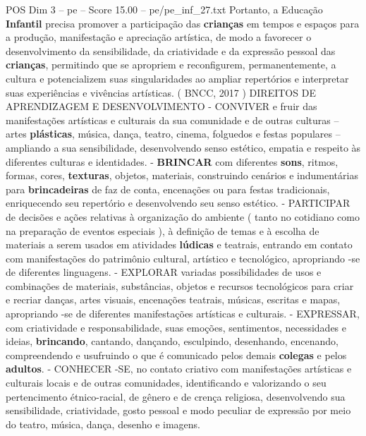 \begin{textsample}{POS Dim 3 – pe – Score 15.00 – pe/pe\_inf\_27.txt}
Portanto, a Educação \textbf{Infantil} precisa promover a participação das \textbf{crianças} em tempos e espaços para a produção, manifestação e apreciação artística, de modo a favorecer o desenvolvimento da sensibilidade, da criatividade e da expressão pessoal das \textbf{crianças}, permitindo que se apropriem e reconfigurem, permanentemente, a cultura e potencializem suas singularidades ao ampliar repertórios e interpretar suas experiências e vivências artísticas. ( BNCC, 2017 ) DIREITOS DE APRENDIZAGEM E DESENVOLVIMENTO - CONVIVER e fruir das manifestações artísticas e culturais da sua comunidade e de outras culturas – artes \textbf{plásticas}, música, dança, teatro, cinema, folguedos e festas populares – ampliando a sua sensibilidade, desenvolvendo senso estético, empatia e respeito às diferentes culturas e identidades. - \textbf{BRINCAR} com diferentes \textbf{sons}, ritmos, formas, cores, \textbf{texturas}, objetos, materiais, construindo cenários e indumentárias para \textbf{brincadeiras} de faz de conta, encenações ou para festas tradicionais, enriquecendo seu repertório e desenvolvendo seu senso estético. - PARTICIPAR de decisões e ações relativas à organização do ambiente ( tanto no cotidiano como na preparação de eventos especiais ), à definição de temas e à escolha de materiais a serem usados em atividades \textbf{lúdicas} e teatrais, entrando em contato com manifestações do patrimônio cultural, artístico e tecnológico, apropriando -se de diferentes linguagens. - EXPLORAR variadas possibilidades de usos e combinações de materiais, substâncias, objetos e recursos tecnológicos para criar e recriar danças, artes visuais, encenações teatrais, músicas, escritas e mapas, apropriando -se de diferentes manifestações artísticas e culturais. - EXPRESSAR, com criatividade e responsabilidade, suas emoções, sentimentos, necessidades e ideias, \textbf{brincando}, cantando, dançando, esculpindo, desenhando, encenando, compreendendo e usufruindo o que é comunicado pelos demais \textbf{colegas} e pelos \textbf{adultos}. - CONHECER -SE, no contato criativo com manifestações artísticas e culturais locais e de outras comunidades, identificando e valorizando o seu pertencimento étnico-racial, de gênero e de crença religiosa, desenvolvendo sua sensibilidade, criatividade, gosto pessoal e modo peculiar de expressão por meio do teatro, música, dança, desenho e imagens.

\end{textsample}

